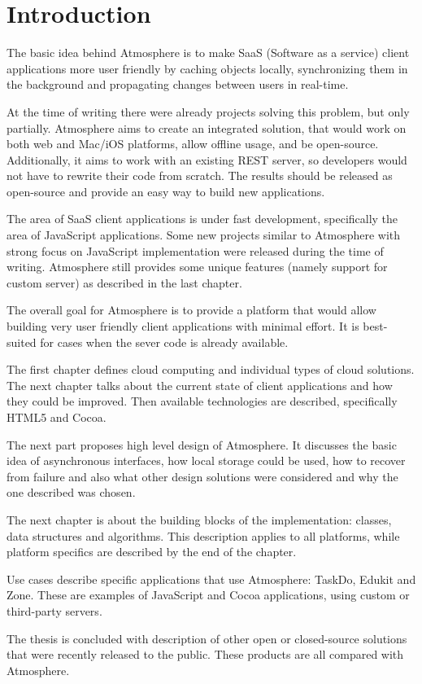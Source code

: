 \setcounter{page}{1}
\setcounter{equation}{0}
\setcounter{figure}{0}
\setcounter{table}{0}

\section*{Introduction}

The basic idea behind Atmosphere is to make SaaS (Software as a service) client applications more user friendly by caching objects locally, synchronizing them in the background and propagating changes between users in real-time.

At the time of writing there were already projects solving this problem, but only partially. Atmosphere aims to create an integrated solution, that would work on both web and Mac/iOS platforms, allow offline usage, and be open-source. Additionally, it aims to work with an existing REST server, so developers would not have to rewrite their code from scratch. The results should be released as open-source and provide an easy way to build new applications.

The area of SaaS client applications is under fast development, specifically the area of JavaScript applications. Some new projects similar to Atmosphere with strong focus on JavaScript implementation were released during the time of writing. Atmosphere still provides some unique features (namely support for custom server) as described in the last chapter.

The overall goal for Atmosphere is to provide a platform that would allow building very user friendly client applications with minimal effort. It is best-suited for cases when the sever code is already available.

The first chapter defines cloud computing and individual types of cloud solutions. The next chapter talks about the current state of client applications and how they could be improved. Then available technologies are described, specifically HTML5 and Cocoa.

The next part proposes high level design of Atmosphere. It discusses the basic idea of asynchronous interfaces, how local storage could be used, how to recover from failure and also what other design solutions were considered and why the one described was chosen.

The next chapter is about the building blocks of the implementation: classes, data structures and algorithms. This description applies to all platforms, while platform specifics are described by the end of the chapter.

Use cases describe specific applications that use Atmosphere: TaskDo, Edukit and Zone. These are examples of JavaScript and Cocoa applications, using custom or third-party servers.

The thesis is concluded with description of other open or closed-source solutions that were recently released to the public. These products are all compared with Atmosphere.